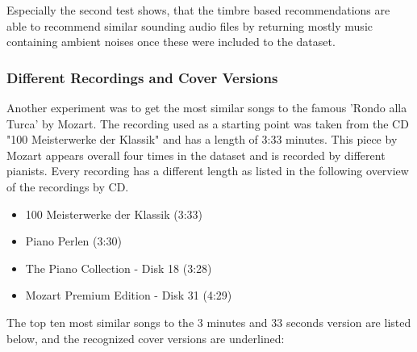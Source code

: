 \noindent Especially the second test shows, that the timbre based recommendations are able to recommend similar sounding audio files by returning mostly music containing ambient noises once these were included to the dataset.

\subsubsection{Different Recordings and Cover Versions}\label{covermfcc}
Another experiment was to get the most similar songs to the famous 'Rondo alla Turca' by Mozart.
The recording used as a starting point was taken from the CD "100 Meisterwerke der Klassik" and has a length of 3:33 minutes. This piece by Mozart appears overall four times in the dataset and is recorded by different pianists.
Every recording has a different length as listed in the following overview of the recordings by CD.

\begin{itemize}
	\setlength\itemsep{-0.5em}
	\item 100 Meisterwerke der Klassik (3:33)
	\item Piano Perlen (3:30)
	\item The Piano Collection - Disk 18 (3:28)
	\item Mozart Premium Edition - Disk 31 (4:29)
	
\end{itemize}

\noindent The top ten most similar songs to the 3 minutes and 33 seconds version are listed below, and the recognized cover versions are underlined:

